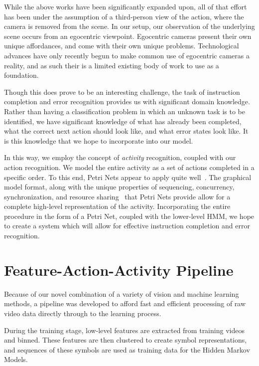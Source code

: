 \documentclass[10pt,twocolumn,letterpaper]{article}
\begin{document}
While the above works have been significantly expanded upon, all of that effort has been under the assumption of a third-person view of the action, where the camera is removed from the scene. In our setup, our observation of the underlying scene occurs from an egocentric viewpoint. Egocentric cameras present their own unique affordances, and come with their own unique problems. Technological advances have only recently begun to make common use of egocentric cameras a reality, and as such their is a limited existing body of work to use as a foundation.

Though this does prove to be an interesting challenge, the task of instruction completion and error recognition provides us with significant domain knowledge. Rather than having a classification problem in which an unknown task is to be identified, we have significant knowledge of what has already been completed, what the correct next action should look like, and what error states look like. It is this knowledge that we hope to incorporate into our model.

In this way, we employ the concept of \emph{activity} recognition, coupled with our action recognition. We model the entire activity as a set of actions completed in a specific order. To this end, Petri Nets appear to apply quite well~\cite{petri1966communication}. The graphical model format, along with the unique properties of sequencing, concurrency, synchronization, and resource sharing~\cite{david1994petri} that Petri Nets provide allow for a complete high-level representation of the activity. Incorporating the entire procedure in the form of a Petri Net, coupled with the lower-level HMM, we hope to create a system which will allow for effective instruction completion and error recognition.


\section{Feature-Action-Activity Pipeline}
Because of our novel combination of a variety of vision and machine learning methods, a pipeline was developed to afford fast and efficient processing of raw video data directly through to the learning process.

During the training stage, low-level features are extracted from training videos and binned. These features are then clustered to create symbol representations, and sequences of these symbols are used as training data for the Hidden Markov Models.
\end{document}
